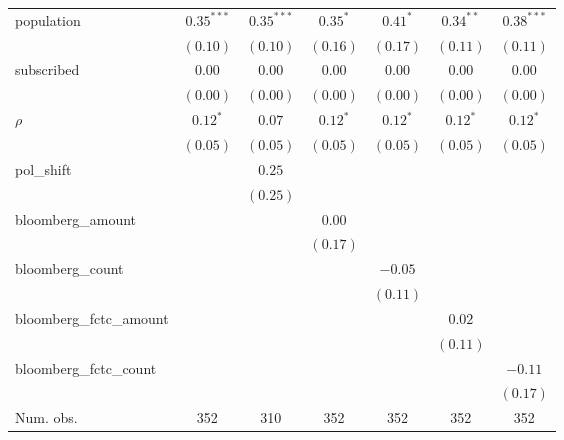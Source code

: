 \begin{table}[!h]
\begin{center}
\begin{tabular}{l c c c c c c }
population              & $0.35^{***}$ & $0.35^{***}$ & $0.35^{*}$   & $0.41^{*}$   & $0.34^{**}$  & $0.38^{***}$ \\
                        & $(0.10)$     & $(0.10)$     & $(0.16)$     & $(0.17)$     & $(0.11)$     & $(0.11)$     \\
subscribed              & $0.00$       & $0.00$       & $0.00$       & $0.00$       & $0.00$       & $0.00$       \\
                        & $(0.00)$     & $(0.00)$     & $(0.00)$     & $(0.00)$     & $(0.00)$     & $(0.00)$     \\
$\rho$                  & $0.12^{*}$   & $0.07$       & $0.12^{*}$   & $0.12^{*}$   & $0.12^{*}$   & $0.12^{*}$   \\
                        & $(0.05)$     & $(0.05)$     & $(0.05)$     & $(0.05)$     & $(0.05)$     & $(0.05)$     \\
pol\_shift              &              & $0.25$       &              &              &              &              \\
                        &              & $(0.25)$     &              &              &              &              \\
bloomberg\_amount       &              &              & $0.00$       &              &              &              \\
                        &              &              & $(0.17)$     &              &              &              \\
bloomberg\_count        &              &              &              & $-0.05$      &              &              \\
                        &              &              &              & $(0.11)$     &              &              \\
bloomberg\_fctc\_amount &              &              &              &              & $0.02$       &              \\
                        &              &              &              &              & $(0.11)$     &              \\
bloomberg\_fctc\_count  &              &              &              &              &              & $-0.11$      \\
                        &              &              &              &              &              & $(0.17)$     \\
\midrule
Num. obs.               & 352          & 310          & 352          & 352          & 352          & 352          \\

\end{tabular}
\end{center}
\end{table}
